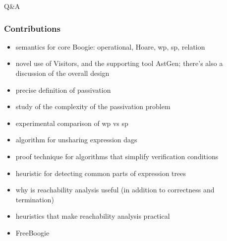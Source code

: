\documentclass{beamer}
\begin{document}
\begin{frame}
\centerline{\Huge Q\&A}
\end{frame}
\begin{frame}
  \frametitle{Contributions}
  \begin{itemize}
  \item semantics for core Boogie: operational, Hoare, wp, sp, relation
  \item novel use of Visitors, and the supporting tool AstGen; there's
    also a discussion of the overall design
  \item precise definition of passivation 
  \item study of the complexity of the passivation problem
  \item experimental comparison of wp vs sp
  \item algorithm for unsharing expression dags
  \item proof technique for algorithms that simplify verification conditions
  \item heuristic for detecting common parts of expression trees
  \item why is reachability analysis useful (in addition to correctness
    and termination)
  \item heuristics that make reachability analysis practical 
  \item FreeBoogie
  \end{itemize}
\end{frame}
\end{document}
